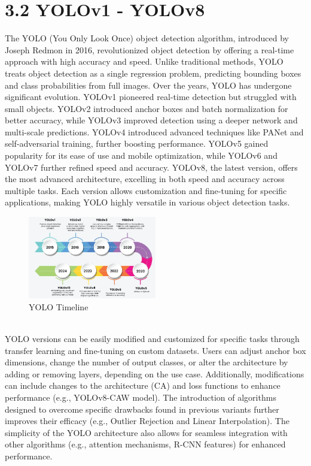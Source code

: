 \section*{3.2 YOLOv1 - YOLOv8}
The YOLO (You Only Look Once) object detection algorithm, introduced by Joseph Redmon in 2016, revolutionized object detection by offering a real-time approach with high accuracy and speed. Unlike traditional methods, YOLO treats object detection as a single regression problem, predicting bounding boxes and class probabilities from full images. Over the years, YOLO has undergone significant evolution. YOLOv1 pioneered real-time detection but struggled with small objects. YOLOv2 introduced anchor boxes and batch normalization for better accuracy, while YOLOv3 improved detection using a deeper network and multi-scale predictions. YOLOv4 introduced advanced techniques like PANet and self-adversarial training, further boosting performance. YOLOv5 gained popularity for its ease of use and mobile optimization, while YOLOv6 and YOLOv7 further refined speed and accuracy. YOLOv8, the latest version, offers the most advanced architecture, excelling in both speed and accuracy across multiple tasks. Each version allows customization and fine-tuning for specific applications, making YOLO highly versatile in various object detection tasks.
%
\begin{figure}[h!]
    \centering
    \includegraphics[width=0.5\textwidth]{images/Yolo Timeline.png}
    \caption{YOLO Timeline}
    \label{fig:enter-label}
\end{figure}\\
%
YOLO versions can be easily modified and customized for specific tasks through transfer learning and fine-tuning on custom datasets. Users can adjust anchor box dimensions, change the number of output classes, or alter the architecture by adding or removing layers, depending on the use case. Additionally, modifications can include changes to the architecture (CA) and loss functions to enhance performance (e.g., YOLOv8-CAW model). The introduction of algorithms designed to overcome specific drawbacks found in previous variants further improves their efficacy (e.g., Outlier Rejection and Linear Interpolation). The simplicity of the YOLO architecture also allows for seamless integration with other algorithms (e.g., attention mechanisms, R-CNN features) for enhanced performance.
